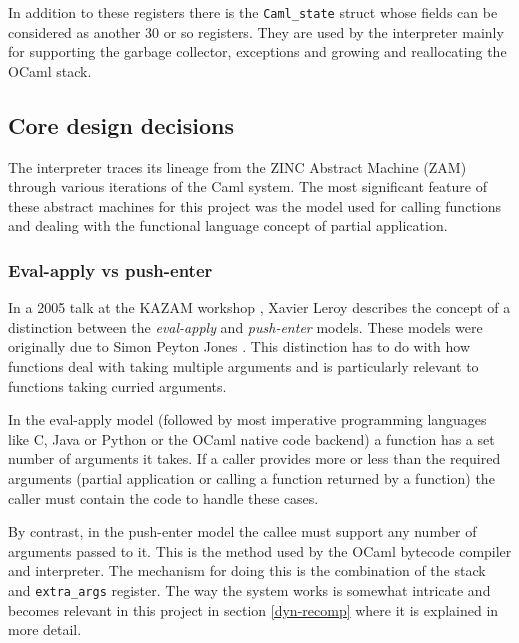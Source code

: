 In addition to these registers there is the \texttt{Caml\_state} struct whose fields can be
considered as another 30 or so registers. They are used by the interpreter mainly for supporting
the garbage collector, exceptions and growing and reallocating the OCaml stack.

\subsection{Core design decisions}

The interpreter traces its lineage from the ZINC Abstract Machine (ZAM) \cite{zinc} through various
iterations of the Caml system. The most significant feature of these abstract machines for this
project was the model used for calling functions and dealing with the functional language concept
of partial application.

\subsubsection{Eval-apply vs push-enter}

In a 2005 talk at the KAZAM workshop \cite{xavtalk}, Xavier Leroy describes the concept of a
distinction between the \emph{eval-apply} and \emph{push-enter} models. These models were
originally due to Simon Peyton Jones \cite{jones}\cite{marlow-jones}. This distinction has to do
with how functions deal with taking
multiple arguments and is particularly relevant to functions taking curried arguments.

In the eval-apply model (followed by most imperative programming languages like C, Java or Python
or
the OCaml native code backend) a function has a set number of arguments it takes. If a caller
provides more or less than the required arguments (partial application or calling a function
returned by a function) the caller must contain the code to handle these cases.

By contrast, in the push-enter model the callee must support any number of arguments passed to it.
This is the method used by the OCaml bytecode compiler and interpreter. The mechanism for doing
this is
the combination of the stack and \texttt{extra\_args} register. The way the system works is
somewhat intricate
and becomes relevant in this project in section \ref{dyn-recomp} where it is explained in more
detail.


